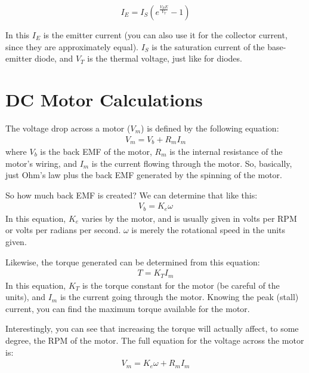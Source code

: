 \begin{equation}
I_E = I_S(e^{\frac{V_BE}{V_T}} - 1)
\end{equation}

In this $I_E$ is the emitter current (you can also use it for the collector current, since they are approximately equal).
$I_S$ is the saturation current of the base-emitter diode, and $V_T$ is the thermal voltage, just like for diodes.





\section{DC Motor Calculations}
\label{appDCMotorCalculations}

The voltage drop across a motor ($V_m$) is defined by the following equation:
\begin{align*}
V_m = V_b + R_m I_m
\end{align*}
where $V_b$ is the back EMF of the motor, $R_m$ is the internal resistance of the motor's wiring, and $I_m$ is the current flowing through the motor.
So, basically, just Ohm's law plus the back EMF generated by the spinning of the motor.

So how much back EMF is created?  We can determine that like this:
\begin{align*}
V_b = K_e \omega
\end{align*}
In this equation, $K_e$ varies by the motor, and is usually given in volts per RPM or volts per radians per second.
$\omega$ is merely the rotational speed in the units given.

Likewise, the torque generated can be determined from this equation:
\begin{align*}
T = K_T I_m
\end{align*}
In this equation, $K_T$ is the torque constant for the motor (be careful of the units), and $I_m$ is the current going through the motor.
Knowing the peak (stall) current, you can find the maximum torque available for the motor.

Interestingly, you can see that increasing the torque will actually affect, to some degree, the RPM of the motor.
The full equation for the voltage across the motor is:
\begin{align*}
V_m = K_e \omega + R_m I_m
\end{align*}

